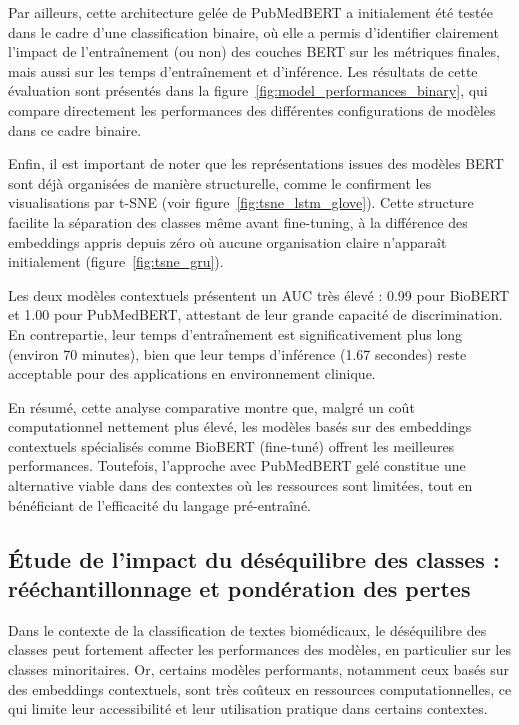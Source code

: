 \documentclass[12pt]{report}
\begin{document}
Par ailleurs, cette architecture gelée de PubMedBERT a initialement été testée dans le cadre d’une classification binaire, où elle a permis d’identifier clairement l’impact de l'entraînement (ou non) des couches BERT sur les métriques finales, mais aussi sur les temps d’entraînement et d’inférence. Les résultats de cette évaluation sont présentés dans la figure~\ref{fig:model_performances_binary}, qui compare directement les performances des différentes configurations de modèles dans ce cadre binaire.

Enfin, il est important de noter que les représentations issues des modèles BERT sont déjà organisées de manière structurelle, comme le confirment les visualisations par t-SNE (voir figure~\ref{fig:tsne_lstm_glove}). Cette structure facilite la séparation des classes même avant fine-tuning, à la différence des embeddings appris depuis zéro où aucune organisation claire n’apparaît initialement (figure~\ref{fig:tsne_gru}).

Les deux modèles contextuels présentent un AUC très élevé : 0.99 pour BioBERT et 1.00 pour PubMedBERT, attestant de leur grande capacité de discrimination. En contrepartie, leur temps d'entraînement est significativement plus long (environ 70 minutes), bien que leur temps d’inférence (1.67 secondes) reste acceptable pour des applications en environnement clinique.

En résumé, cette analyse comparative montre que, malgré un coût computationnel nettement plus élevé, les modèles basés sur des embeddings contextuels spécialisés comme BioBERT (fine-tuné) offrent les meilleures performances. Toutefois, l’approche avec PubMedBERT gelé constitue une alternative viable dans des contextes où les ressources sont limitées, tout en bénéficiant de l'efficacité du langage pré-entraîné.

\subsection{Étude de l’impact du déséquilibre des classes : rééchantillonnage et pondération des pertes}

Dans le contexte de la classification de textes biomédicaux, le déséquilibre des classes peut fortement affecter les performances des modèles, en particulier sur les classes minoritaires. Or, certains modèles performants, notamment ceux basés sur des embeddings contextuels, sont très coûteux en ressources computationnelles, ce qui limite leur accessibilité et leur utilisation pratique dans certains contextes.
\end{document}
